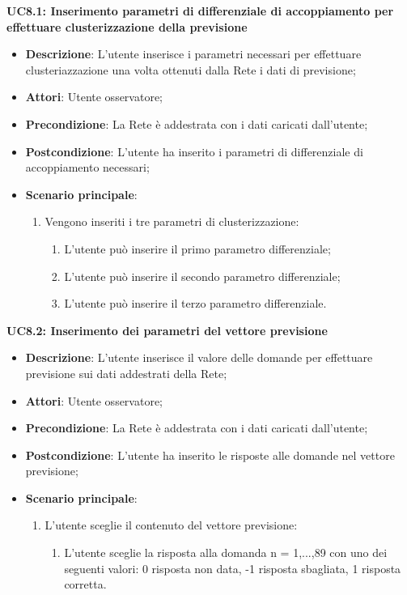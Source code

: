 \textbf{UC8.1: Inserimento parametri di differenziale di accoppiamento per effettuare clusterizzazione della previsione}
\label{UC8.1: Inserimento parametri di differenziale di accoppiamento per effettuare clusterizzazione della previsione}
\noindent
\begin{itemize}
\item \textbf{Descrizione}: L'utente inserisce i parametri necessari per effettuare clusteriazzazione una volta ottenuti dalla Rete i dati di previsione;
\item \textbf{Attori}: Utente osservatore;
\item \textbf{Precondizione}: La Rete \`e addestrata con i dati caricati dall'utente;
\item \textbf{Postcondizione}: L'utente ha inserito i parametri di differenziale di accoppiamento necessari;
\item \textbf{Scenario principale}:
\begin{enumerate} 
\item Vengono inseriti i tre parametri di clusterizzazione:
\begin{enumerate}
\item L'utente pu\`o inserire il primo parametro differenziale;
\item L'utente pu\`o inserire il secondo parametro differenziale;
\item L'utente pu\`o inserire il terzo parametro differenziale.
\end{enumerate}
\end{enumerate}
\end{itemize}

\textbf{UC8.2: Inserimento dei parametri del vettore previsione}\mbox{}
\label{UC8.2: Inserimento dei parametri del vettore previsione}
\noindent
\begin{itemize}
\item \textbf{Descrizione}: L'utente inserisce il valore delle domande per effettuare previsione sui dati addestrati della Rete;
\item \textbf{Attori}: Utente osservatore;
\item \textbf{Precondizione}: La Rete \`e addestrata con i dati caricati dall'utente;
\item \textbf{Postcondizione}: L'utente ha inserito le risposte alle domande nel vettore previsione;
\item \textbf{Scenario principale}:
\begin{enumerate}
\item L'utente sceglie il contenuto del vettore previsione:
\begin{enumerate}
\item L'utente sceglie la risposta alla domanda n = {1,...,89} con uno dei seguenti valori: 0 risposta non data, -1 risposta sbagliata, 1 risposta corretta.
\end{enumerate}
\end{enumerate}
\end{itemize}

